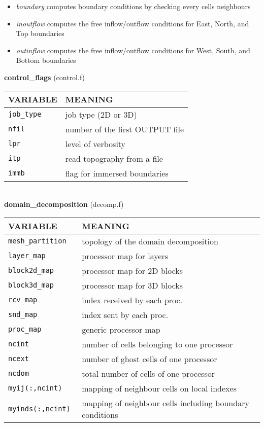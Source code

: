 \begin{itemize}
\item {\em boundary} computes boundary conditions by checking every cells neighbours 
\item {\em inoutflow} computes the free inflow/outflow conditions for East, North, and Top boundaries
\item {\em outinflow} computes the free inflow/outflow conditions for West, South, and Bottom boundaries
\end{itemize}
%
%
{\large {\bf control\_flags}} (control.f)\\[5mm]
\begin{tabular}{|p{6cm}|p{6cm}|}\hline
VARIABLE & MEANING\\\hline
\tt  job\_type    & job type (2D or 3D) \\\hline
\tt  nfil         & number of the first OUTPUT file \\\hline
\tt  lpr          & level of verbosity \\\hline
\tt  itp          & read topography from a file \\\hline
\tt  immb         & flag for immersed boundaries \\\hline
\end{tabular}\\[5mm]
%
%
{\large{\bf domain\_decomposition}} (decomp.f)\\[5mm]
\begin{tabular}{|p{6cm}|p{6cm}|}\hline
VARIABLE & MEANING\\\hline
\tt mesh\_partition   & topology of the domain decomposition\\ \hline
\tt layer\_map   & processor map for layers\\ \hline
\tt block2d\_map & processor map for 2D blocks\\ \hline
\tt block3d\_map & processor map for 3D blocks\\ \hline
\tt rcv\_map   & index received by each proc.\\ \hline
\tt snd\_map & index sent by each proc.\\ \hline
\tt proc\_map & generic processor map\\ \hline
\tt ncint    & number of cells belonging to one processor\\ \hline
\tt ncext    & number of ghost cells of one processor\\ \hline
\tt ncdom    & total number of cells of one processor\\ \hline
\tt myij(:,ncint)   &  mapping of neighbour cells on local indexes\\ \hline
\tt myinds(:,ncint) &  mapping of neighbour cells including boundary conditions\\ \hline
\end{tabular}\\[5mm]
